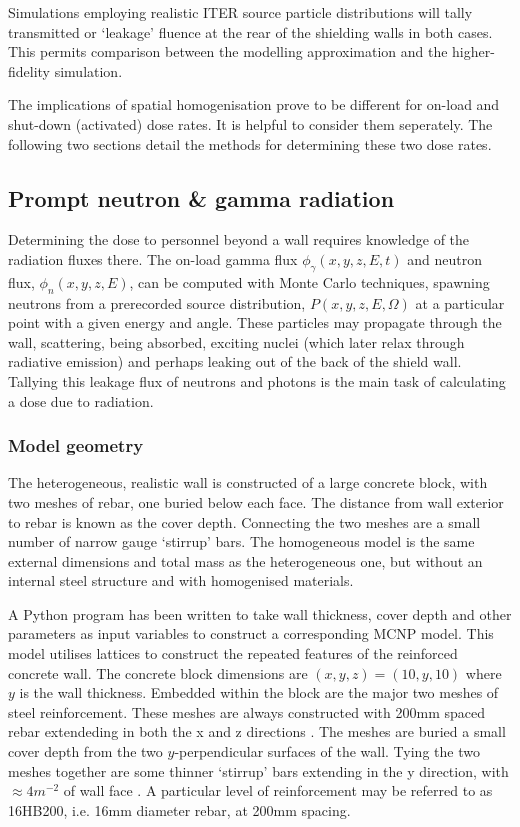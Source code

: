 Simulations employing realistic ITER source particle distributions will tally transmitted or `leakage' fluence at the rear of the shielding walls in both cases. This permits comparison between the modelling approximation and the higher-fidelity simulation.

The implications of spatial homogenisation prove to be different for on-load and shut-down (activated) dose rates. It is helpful to consider them seperately. The following two sections detail the methods for determining these two dose rates.

\subsection{Prompt neutron \& gamma radiation}
Determining the dose to personnel beyond a wall requires knowledge of the radiation fluxes there. The on-load gamma flux $\phi_{\gamma}(x,y,z,E,t)$ and neutron flux, $\phi_{n}(x,y,z,E)$, can be computed with Monte Carlo techniques, spawning neutrons from a prerecorded source distribution, $P(x,y,z,E,\Omega)$ at a particular point with a given energy and angle. These particles may propagate through the wall, scattering, being absorbed, exciting nuclei (which later relax through radiative emission) and perhaps leaking out of the back of the shield wall. Tallying this leakage flux of neutrons and photons is the main task of calculating a dose due to radiation.

\subsubsection{Model geometry}
The heterogeneous, realistic wall is constructed of a large concrete block, with two meshes of rebar, one buried below each face. The distance from wall exterior to rebar is known as the cover depth. Connecting the two meshes are a small number of narrow gauge `stirrup' bars. The homogeneous model is the same external dimensions and total mass as the heterogeneous one, but without an internal steel structure and with homogenised materials.

A Python program has been written to take wall thickness, cover depth and other parameters as input variables to construct a corresponding MCNP model. This model utilises lattices to construct the repeated features of the reinforced concrete wall. The concrete block dimensions are $(x, y, z) = (10, y, 10)$ where $y$ is the wall thickness. Embedded within the block are the major two meshes of steel reinforcement. These meshes are always constructed with 200mm spaced rebar extendeding in both the x and z directions \cite{Perez2014}. The meshes are buried a small cover depth from the two $y$-perpendicular surfaces of the wall. Tying the two meshes together are some thinner `stirrup' bars extending in the y direction, with $\approx 4m^{-2}$ of wall face \cite{Perez2014}. A particular level of reinforcement may be referred to as 16HB200, i.e. 16mm diameter rebar, at 200mm spacing.

